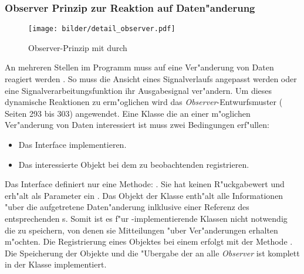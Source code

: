\subsubsection{Observer Prinzip zur Reaktion auf Daten"anderung}

\begin{figure}[bth]
\centering
\texttt{[image: bilder/detail\_observer.pdf]}
\caption{Observer-Prinzip mit durch }
\label{pic:observer}
\end{figure}

An mehreren Stellen im Programm muss auf eine Ver"anderung von Daten reagiert werden .
So muss die Ansicht eines Signalverlaufs angepasst werden oder eine Signalverarbeitungsfunktion ihr Ausgabesignal ver"andern.
Um dieses dynamische Reaktionen zu erm"oglichen wird das \emph{Observer}-Entwurfsmuster (\cite{Gamma1995} Seiten 293 bis 303) angewendet.
Eine Klasse die an einer m"oglichen Ver"anderung von Daten interessiert ist muss zwei Bedingungen erf"ullen:
\begin{itemize}
	\item Das Interface  implementieren.
	\item Das interessierte Objekt bei dem zu beobachtenden  registrieren.
\end{itemize}
Das Interface  definiert nur eine Methode: .
Sie hat keinen R"uckgabewert und erh"alt als Parameter ein .
Das Objekt der Klasse  enth"alt alle Informationen "uber die aufgetretene Daten"anderung inlklusive einer Referenz des entsprechenden s.
Somit ist es f"ur -implementierende Klassen nicht notwendig die  zu speichern, von denen sie Mitteilungen "uber Ver"anderungen erhalten m"ochten.
Die Registrierung eines Objektes bei einem  erfolgt mit der Methode .
Die Speicherung der Objekte und die "Ubergabe der  an alle \emph{Observer} ist komplett in der Klasse  implementiert.

